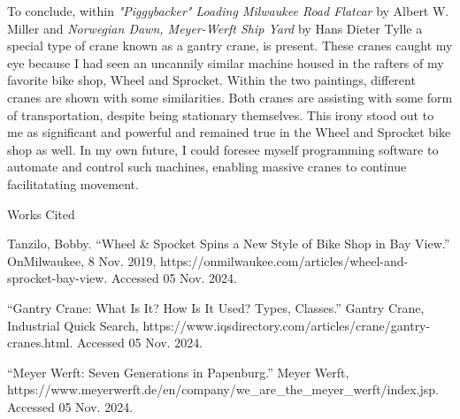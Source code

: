 \documentclass[12pt]{article}
\begin{document}
To conclude, within \textit{"Piggybacker" Loading Milwaukee Road Flatcar} by Albert W. Miller and \textit{Norwegian Dawn, Meyer-Werft Ship Yard} by 
Hans Dieter Tylle a special type of crane known as a gantry crane, is present. These cranes caught my eye because I had seen an uncannily similar machine housed
in the rafters of my favorite bike shop, Wheel and Sprocket. Within the two paintings, different cranes are shown with some similarities. Both cranes are
assisting with some form of transportation, despite being stationary themselves. This irony stood out to me as significant and powerful and remained true
in the Wheel and Sprocket bike shop as well. In my own future, I could foresee myself programming software to automate and control such machines, enabling
massive cranes to continue facilitatating movement.

\newpage

\begin{center}
Works Cited
\end{center}

\begin{hangparas}{0.5in}{1}

Tanzilo, Bobby. “Wheel \& Spocket Spins a New Style of Bike Shop in Bay View.”
OnMilwaukee, 8 Nov. 2019, https://onmilwaukee.com/articles/wheel-and-sprocket-bay-view. Accessed 05 Nov. 2024.

“Gantry Crane: What Is It? How Is It Used? Types, Classes.” Gantry Crane, Industrial Quick Search,
https://www.iqsdirectory.com/articles/crane/gantry-cranes.html. Accessed 05 Nov. 2024. 

“Meyer Werft: Seven Generations in Papenburg.” Meyer Werft,\\
    https://www.meyerwerft.de/en/company/we\_are\_the\_meyer\_werft/index.jsp. Accessed 05 Nov. 2024. 

\end{hangparas}
\end{document}
